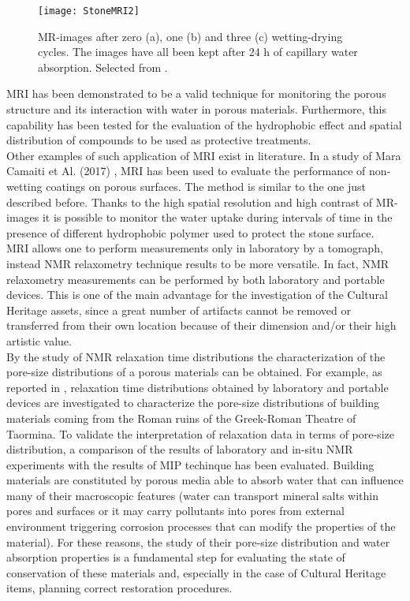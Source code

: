 \documentclass[a4paper,11pt]{report}
\begin{document}
\begin{figure}[h] 
\centering
\texttt{[image: StoneMRI2]}	
\caption{MR-images after zero (a), one (b) and three (c) wetting-drying cycles. The images have all been kept after 24 h of capillary water absorption. Selected from \cite{trestone}.}
\label{MRI:2}
\end{figure}


MRI has been demonstrated to be a valid technique for monitoring the porous structure and its interaction with  water  in porous materials. Furthermore, this capability has been tested for the evaluation of the hydrophobic effect and spatial distribution of compounds to be used as protective treatments. \\
Other examples of such application of MRI exist in literature. In a study of Mara Camaiti et Al. (2017) \cite{quattrostone}, MRI has been used to evaluate the performance of non-wetting coatings on porous surfaces. The method is similar to the one just described before. Thanks to the high spatial resolution and high contrast of MR-images it is possible to monitor the water uptake during intervals of time in the presence of different hydrophobic polymer used to protect the stone surface. \\
MRI allows one to perform measurements only in laboratory by a tomograph, instead NMR relaxometry technique results to be more versatile. In fact, NMR relaxometry measurements can be performed  by both laboratory  and portable devices. This is one of the main advantage for the investigation of the Cultural Heritage assets, since a great number of artifacts cannot be removed or transferred from their own location because of their dimension and/or their high artistic value.\\
By the study of NMR relaxation time distributions the characterization of the pore-size distributions of a porous materials can be obtained. For example, as reported in \cite{due}, relaxation time distributions obtained by laboratory and portable devices are investigated to characterize the pore-size distributions of building materials coming from the Roman ruins of the Greek-Roman Theatre of Taormina. To validate the interpretation of relaxation data in terms of pore-size distribution, a comparison of the results of laboratory and in-situ NMR experiments with the results of MIP techinque has been evaluated. Building materials are constituted by porous media able to absorb water that can influence many of their macroscopic features (water can transport mineral salts within pores and surfaces or it may carry pollutants into pores from external environment triggering corrosion processes that can modify the properties of the material). For these reasons, the study of their pore-size distribution and water absorption properties is a fundamental step for evaluating the state of conservation of these materials and, especially in the case of Cultural Heritage items, planning correct restoration procedures.\\
\end{document}
